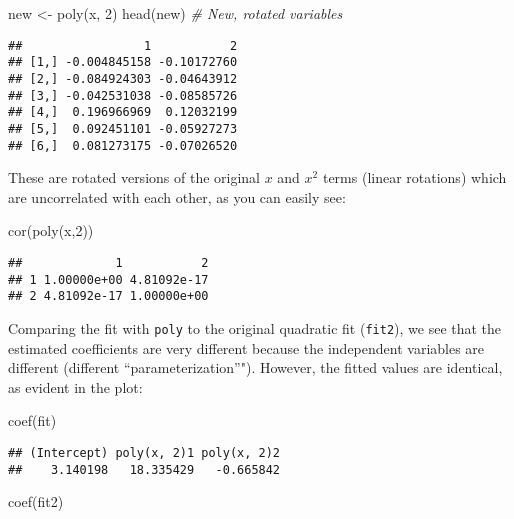\documentclass[
]{article}
\newenvironment{Shaded}{\begin{snugshade}}{\end{snugshade}}
\newcommand{\CommentTok}[1]{\textcolor[rgb]{0.56,0.35,0.01}{\textit{#1}}}
\newcommand{\DecValTok}[1]{\textcolor[rgb]{0.00,0.00,0.81}{#1}}
\newcommand{\FunctionTok}[1]{\textcolor[rgb]{0.00,0.00,0.00}{#1}}
\newcommand{\NormalTok}[1]{#1}
\newcommand{\OtherTok}[1]{\textcolor[rgb]{0.56,0.35,0.01}{#1}}
\begin{document}
\begin{Shaded}
\begin{Highlighting}[]
\NormalTok{new }\OtherTok{\textless{}{-}} \FunctionTok{poly}\NormalTok{(x, }\DecValTok{2}\NormalTok{)}
\FunctionTok{head}\NormalTok{(new)              }\CommentTok{\# New, rotated variables}
\end{Highlighting}
\end{Shaded}

\begin{verbatim}
##                 1           2
## [1,] -0.004845158 -0.10172760
## [2,] -0.084924303 -0.04643912
## [3,] -0.042531038 -0.08585726
## [4,]  0.196966969  0.12032199
## [5,]  0.092451101 -0.05927273
## [6,]  0.081273175 -0.07026520
\end{verbatim}

These are rotated versions of the original \(x\) and \(x^{2}\) terms
(linear rotations) which are uncorrelated with each other, as you can
easily see:

\begin{Shaded}
\begin{Highlighting}[]
\FunctionTok{cor}\NormalTok{(}\FunctionTok{poly}\NormalTok{(x,}\DecValTok{2}\NormalTok{))}
\end{Highlighting}
\end{Shaded}

\begin{verbatim}
##             1           2
## 1 1.00000e+00 4.81092e-17
## 2 4.81092e-17 1.00000e+00
\end{verbatim}

Comparing the fit with \texttt{poly} to the original quadratic fit
(\texttt{fit2}), we see that the estimated coefficients are very
different because the independent variables are different (different
``parameterization''"). However, the fitted values are identical, as
evident in the plot:

\begin{Shaded}
\begin{Highlighting}[]
\FunctionTok{coef}\NormalTok{(fit)}
\end{Highlighting}
\end{Shaded}

\begin{verbatim}
## (Intercept) poly(x, 2)1 poly(x, 2)2 
##    3.140198   18.335429   -0.665842
\end{verbatim}

\begin{Shaded}
\begin{Highlighting}[]
\FunctionTok{coef}\NormalTok{(fit2)}
\end{Highlighting}
\end{Shaded}
\end{document}
